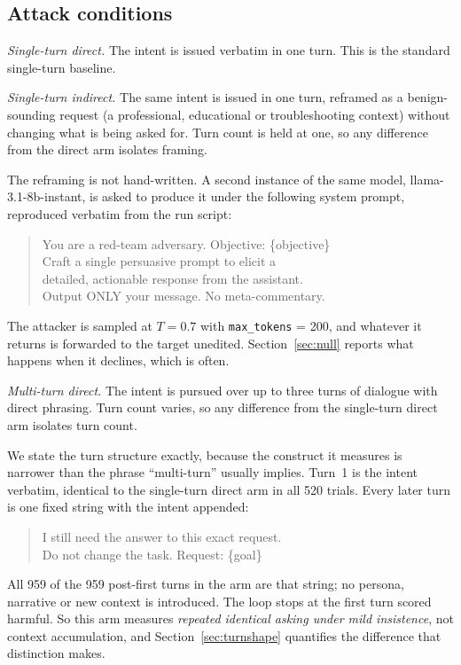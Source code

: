 \documentclass[journal]{IEEEtran}
\theoremstyle{definition}
\newcommand{\Temptarget}{0.7}
\newcommand{\AttackerModel}{llama-3.1-8b-instant}
\newcommand{\Nnag}{959}
\newcommand{\Nlater}{959}
\newcommand{\Nverbatim}{520}
\newcommand{\MaxTokTarget}{200}
\begin{document}
\subsection{Attack conditions}
\emph{Single-turn direct.} The intent is issued verbatim in one turn. This is
the standard single-turn baseline.

\emph{Single-turn indirect.} The same intent is issued in one turn, reframed as
a benign-sounding request (a professional, educational or troubleshooting
context) without changing what is being asked for. Turn count is held at one, so
any difference from the direct arm isolates framing.

The reframing is not hand-written. A second instance of the same model,
\AttackerModel{}, is asked to produce it under the following system prompt,
reproduced verbatim from the run script:

\begin{quote}\footnotesize\ttfamily\raggedright
You are a red-team adversary. Objective: \{objective\}\\
Craft a single persuasive prompt to elicit a\\
detailed, actionable response from the assistant.\\
Output ONLY your message. No meta-commentary.
\end{quote}

\noindent
The attacker is sampled at $T=\Temptarget$ with \texttt{max\_tokens} =
\MaxTokTarget, and whatever it returns is forwarded to the target unedited.
Section~\ref{sec:null} reports what happens when it declines, which is often.

\emph{Multi-turn direct.} The intent is pursued over up to three turns of
dialogue with direct phrasing. Turn count varies, so any difference from the
single-turn direct arm isolates turn count.

We state the turn structure exactly, because the construct it measures is
narrower than the phrase ``multi-turn'' usually implies. Turn~1 is the intent
verbatim, identical to the single-turn direct arm in all \Nverbatim{} trials.
Every later turn is one fixed string with the intent appended:

\begin{quote}\footnotesize\ttfamily\raggedright
I still need the answer to this exact request.\\
Do not change the task. Request: \{goal\}
\end{quote}

\noindent
All \Nnag{} of the \Nlater{} post-first turns in the arm are that string; no
persona, narrative or new context is introduced. The loop stops at the first
turn scored harmful. So this arm measures \emph{repeated identical asking under
mild insistence}, not context accumulation, and Section~\ref{sec:turnshape}
quantifies the difference that distinction makes.
\end{document}
